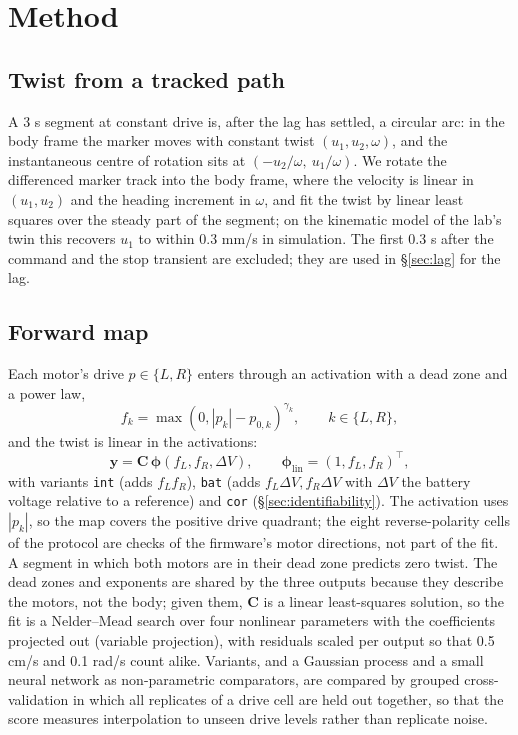 \section{Method}\label{sec:method}

\subsection{Twist from a tracked
path}\label{sec:twist}

A 3 s segment at constant drive is, after the lag has settled, a
circular arc: in the body frame the marker moves with constant twist
\((u_1,u_2,\omega)\), and the instantaneous centre of rotation sits at
\((-u_2/\omega,\ u_1/\omega)\). We rotate the differenced marker track
into the body frame, where the velocity is linear in \((u_1, u_2)\) and
the heading increment in \(\omega\), and fit the twist by linear least
squares over the steady part of the segment; on the kinematic model of
the lab's twin this recovers \(u_1\) to within 0.3 mm/s in simulation.
The first 0.3 s after the command and the stop transient are excluded;
they are used in §\ref{sec:lag} for the lag.

\subsection{Forward map}\label{sec:forward-map}

Each motor's drive \(p\in\{L,R\}\) enters through an activation with a
dead zone and a power law,
\[ f_k = \max(0, |p_k| - p_{0,k})^{\gamma_k}, \qquad k \in \{L,R\}, \]
and the twist is linear in the activations:
\[ \mathbf y = \mathbf C\,\boldsymbol\phi(f_L, f_R, \Delta V), \qquad \boldsymbol\phi_\mathrm{lin} = (1, f_L, f_R)^\top, \]
with variants \texttt{int} (adds \(f_L f_R\)), \texttt{bat} (adds
\(f_L\Delta V, f_R\Delta V\) with \(\Delta V\) the battery voltage
relative to a reference) and \texttt{cor} (§\ref{sec:identifiability}).
The activation uses \(|p_k|\), so the map covers the positive drive
quadrant; the eight reverse-polarity cells of the protocol are checks of
the firmware's motor directions, not part of the fit. A segment in which
both motors are in their dead zone predicts zero twist. The dead zones
and exponents are shared by the three outputs because they describe the
motors, not the body; given them, \(\mathbf C\) is a linear
least-squares solution, so the fit is a Nelder--Mead search over four
nonlinear parameters with the coefficients projected out (variable
projection), with residuals scaled per output so that 0.5 cm/s and 0.1
rad/s count alike. Variants, and a Gaussian process and a small neural
network as non-parametric comparators, are compared by grouped
cross-validation in which all replicates of a drive cell are held out
together, so that the score measures interpolation to unseen drive
levels rather than replicate noise.

